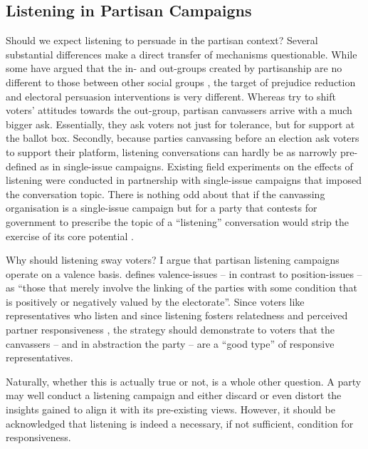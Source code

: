 \documentclass[11pt,a4paper]{scrartcl}
\begin{document}
\subsection{Listening in Partisan Campaigns}

Should we expect listening to persuade in the partisan context? Several substantial differences make a direct transfer of mechanisms questionable. While some have argued that the in- and out-groups created by partisanship are no different to those between other social groups \autocite{nicholsonPolarizingCues2012}, the target of prejudice reduction and electoral persuasion interventions is very different. Whereas \textcite{broockmanDurablyReducingTransphobia2016} try to shift voters' attitudes towards the out-group, partisan canvassers arrive with a much bigger ask. Essentially, they ask voters not just for tolerance, but for support at the ballot box.
Secondly, because parties canvassing before an election ask voters to support their platform, listening conversations can hardly be as narrowly pre-defined as in single-issue campaigns. Existing field experiments on the effects of listening were conducted in partnership with single-issue campaigns that imposed the conversation topic. There is nothing odd about that if the canvassing organisation is a single-issue campaign but for a party that contests for government to prescribe the topic of a \enquote{listening} conversation would strip the exercise of its core potential \autocite[356]{cohenDELIBERATIONDEMOCRATICLEGITIMACY2003}.

Why should listening sway voters? I argue that partisan listening campaigns operate on a valence basis. \textcite{stokesSpatialModelsParty1963} defines valence-issues -- in contrast to position-issues -- as \enquote{those that merely involve the linking of the parties with some condition that is positively or negatively valued by the electorate}. Since voters like representatives who listen \autocite{busbyTheyEvenCare2025} and since listening fosters relatedness \autocite{vogelEvidentiaryBasisPolitical2025} and perceived partner responsiveness \autocite{itzchakovPerceivingOthersResponsive2024}, the strategy should demonstrate to voters that the canvassers -- and in abstraction the party -- are a \enquote{good type} of responsive representatives.

Naturally, whether this is actually true or not, is a whole other question. A party may well conduct a listening campaign and either discard or even distort the insights gained to align it with its pre-existing views. However, it should be acknowledged that listening is indeed a necessary, if not sufficient, condition for responsiveness.
\end{document}
